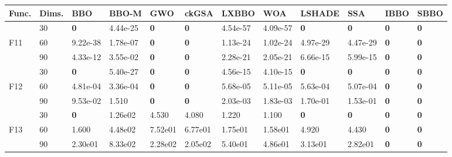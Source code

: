 \begin{table}
\begin{center}
\begin{tabular}{p{0.3in} | p{0.4in} | p{0.6in} |  p{0.6in} |  p{0.6in}|  p{0.6in} |  p{0.6in} | p{0.6in} |  p{0.6in} | p{0.6in} |  p{0.6in} |  p{0.6in}}
\hline\textbf{Func.}     &     \textbf{Dims.}     &     \textbf{BBO}     &     \textbf{BBO-M} &     \textbf{GWO}     &     \textbf{ckGSA}     &     \textbf{LXBBO}     &     \textbf{WOA}     &    \textbf{LSHADE}     &     \textbf{SSA}     &     \textbf{IBBO}     &    \textbf{SBBO} \\
\hline
    &    30    &\textbf{    0    }&    4.44e-25    &\textbf{    0    }&\textbf{    0    }&    4.54e-57    &    4.09e-57    &\textbf{    0    }&\textbf{    0    }&    \textbf{    0    }&    \textbf{    0    }\\
F11    &    60    &    9.22e-38    &    1.78e-07    &\textbf{    0    }&\textbf{    0    }&    1.13e-24    &    1.02e-24    &    4.97e-29    &    4.47e-29    &    \textbf{    0    }&    \textbf{    0    }\\
    &    90    &    4.33e-12    &    3.55e-02    &\textbf{    0    }&\textbf{    0    }&    2.28e-21    &    2.05e-21    &    6.66e-15    &    5.99e-15    &    \textbf{    0    }&    \textbf{    0    }\\
\hline                                                                                                            
    &    30    &\textbf{    0    }&    5.40e-27    &\textbf{    0    }&\textbf{    0    }&    4.56e-15    &    4.10e-15    &\textbf{    0    }&\textbf{    0    }&    \textbf{    0    }&    \textbf{    0    }\\
F12    &    60    &    4.81e-04    &    3.36e-04    &\textbf{    0    }&\textbf{    0    }&    5.68e-05    &    5.11e-05    &    5.63e-04    &    5.07e-04    &    \textbf{    0    }&    \textbf{    0    }\\
    &    90    &    9.53e-02    &    1.510    &\textbf{    0    }&\textbf{    0    }&    2.03e-03    &    1.83e-03    &    1.70e-01    &    1.53e-01    &    \textbf{    0    }&    \textbf{    0    }\\
\hline                                                                                                            
    &    30    &\textbf{    0    }&    1.26e02    &    4.530    &    4.080    &    1.220    &    1.100    &\textbf{    0    }&\textbf{    0    }&    \textbf{    0    }&    \textbf{    0    }\\
F13    &    60    &{    1.600    }&    4.48e02    &    7.52e01    &    6.77e01    &    1.75e01    &    1.58e01    &    4.920    &    4.430    &    \textbf{    0    }&    \textbf{    0    }\\
    &    90    &{    2.30e01    }&    8.33e02    &    2.28e02    &    2.05e02    &    5.40e01    &    4.86e01    &    3.13e01    &    2.82e01    &    \textbf{    0    }&    \textbf{    0    }\\

\end{tabular}
\end{center}
\end{table}
